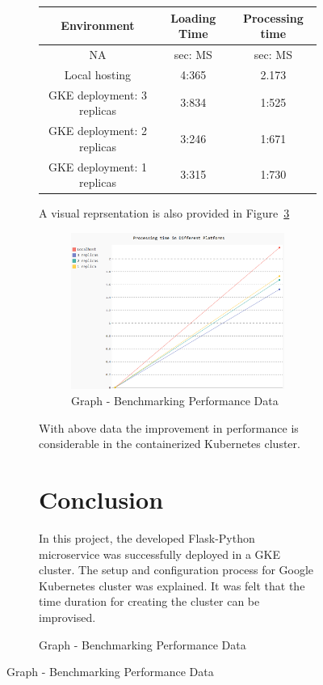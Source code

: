 \begin{figure}[htb]
\begin{figure}[htb]
\begin{table}[htb]
	\begin{tabular}{*{3}{c}}
		\toprule
		Environment & Loading Time  &  Processing time \\
		\midrule
		NA & sec: MS & sec: MS \\
		\midrule
		Local hosting & 4:365  & 2.173 \\
		GKE deployment: 3 replicas & 3:834 & 1:525 \\
    GKE deployment: 2 replicas & 3:246 & 1:671 \\
    GKE deployment: 1 replicas & 3:315 & 1:730 \\
		\bottomrule
	\end{tabular}
\end{table}
A visual reprsentation is also provided in Figure~\ref{fig:benchmark_graph}
\begin{figure}[htb]
	\centering\includegraphics[width=\columnwidth]{images/hid_417_benchmark_graph.png}
  \caption{Graph - Benchmarking Performance Data}
  \label{fig:benchmark_graph}
\end{figure}
With above data the improvement in performance is considerable in the containerized Kubernetes cluster.
\section{Conclusion}


In this project, the developed Flask-Python microservice was successfully
deployed in a GKE cluster. The setup and configuration process for Google
Kubernetes cluster was explained. It was felt that the time duration for
creating the cluster can be improvised.


\end{figure}
\end{figure}
